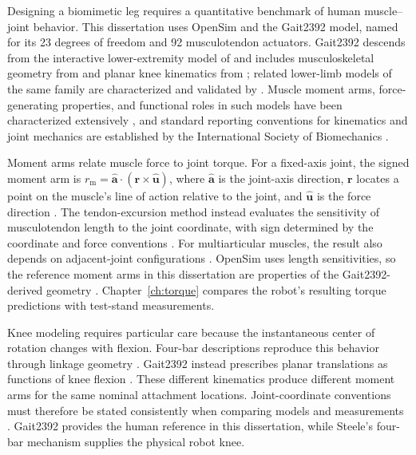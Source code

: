 Designing a biomimetic leg requires a quantitative benchmark of human muscle--joint behavior. This dissertation uses OpenSim \citep{delp_opensim_2007, seth_opensim_2011, seth_opensim_2018} and the Gait2392 model, named for its 23 degrees of freedom and 92 musculotendon actuators. Gait2392 descends from the interactive lower-extremity model of \citet{delp_interactive_1990} and includes musculoskeletal geometry from \citet{hoy_musculoskeletal_1990} and planar knee kinematics from \citet{yamaguchi_planar_1989}; related lower-limb models of the same family are characterized and validated by \citet{arnold_model_2010}. Muscle moment arms, force-generating properties, and functional roles in such models have been characterized extensively \citep{zajac_determining_1989, brand_model_1982, menegaldo_moment_2004, millard_flexing_2013, sherman_what_2013, suderman_moving_2012}, and standard reporting conventions for kinematics and joint mechanics are established by the International Society of Biomechanics \citep{wu_for_1995, wu_isb_2002, wu_isb_2005, derrick_isb_2020}.

Moment arms relate muscle force to joint torque. For a fixed-axis joint, the signed moment arm is $r_{\mathrm{m}}=\hat{\mathbf{a}}\cdot(\mathbf{r}\times\hat{\mathbf{u}})$, where $\hat{\mathbf{a}}$ is the joint-axis direction, $\mathbf{r}$ locates a point on the muscle's line of action relative to the joint, and $\hat{\mathbf{u}}$ is the force direction \citep{brand_model_1982}. The tendon-excursion method instead evaluates the sensitivity of musculotendon length to the joint coordinate, with sign determined by the coordinate and force conventions \citep{menegaldo_moment_2004}. For multiarticular muscles, the result also depends on adjacent-joint configurations \citep{zajac_determining_1989, young_analyzing_2019}. OpenSim uses length sensitivities, so the reference moment arms in this dissertation are properties of the Gait2392-derived geometry \citep{delp_opensim_2007, seth_opensim_2018}. Chapter~\ref{ch:torque} compares the robot's resulting torque predictions with test-stand measurements.

Knee modeling requires particular care because the instantaneous center of rotation changes with flexion. Four-bar descriptions reproduce this behavior through linkage geometry \citep{romero_four-bar_2020, steele_biomimetic_2018}. Gait2392 instead prescribes planar translations as functions of knee flexion \citep{yamaguchi_planar_1989}. These different kinematics produce different moment arms for the same nominal attachment locations. Joint-coordinate conventions must therefore be stated consistently when comparing models and measurements \citep{wu_isb_2002}. Gait2392 provides the human reference in this dissertation, while Steele's four-bar mechanism supplies the physical robot knee.

